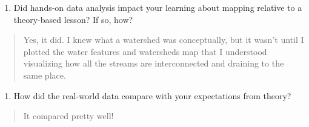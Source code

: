 \documentclass[]{article}
\providecommand{\tightlist}{%
  \setlength{\itemsep}{0pt}\setlength{\parskip}{0pt}}
\begin{document}
\begin{enumerate}
\def\labelenumi{\arabic{enumi}.}
\setcounter{enumi}{14}
\tightlist
\item
  Did hands-on data analysis impact your learning about mapping relative
  to a theory-based lesson? If so, how?
\end{enumerate}

\begin{quote}
Yes, it did. I knew what a watershed was conceptually, but it wasn't
until I plotted the water features and watersheds map that I understood
visualizing how all the streams are interconnected and draining to the
same place.
\end{quote}

\begin{enumerate}
\def\labelenumi{\arabic{enumi}.}
\setcounter{enumi}{15}
\tightlist
\item
  How did the real-world data compare with your expectations from
  theory?
\end{enumerate}

\begin{quote}
It compared pretty well!
\end{quote}
\end{document}
